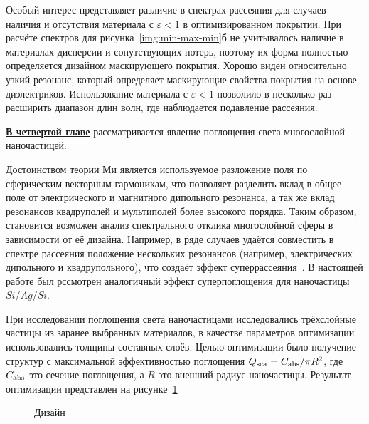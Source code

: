 Особый интерес представляет различие в спектрах рассеяния для случаев
наличия и отсутствия материала с ${\varepsilon<1}$ в оптимизированном
покрытии.  При расчёте спектров для рисунка~\ref{img:min-max-min}б не
учитывалось наличие в материалах дисперсии и сопутствующих потерь,
поэтому их форма полностью определяется дизайном маскирующего
покрытия. Хорошо виден относительно узкий резонанс, который определяет
маскирующие свойства покрытия на основе диэлектриков. Использование
материала с ${\varepsilon<1}$ позволило в несколько раз расширить
диапазон длин волн, где наблюдается подавление рассеяния. 


\underline{\textbf{В четвертой главе}} рассматривается явление
поглощения света многослойной наночастицей.

Достоинством теории Ми является используемое разложение поля по
сферическим векторным гармоникам, что позволяет разделить вклад в
общее поле от электрического и магнитного дипольного резонанса, а так
же вклад резонансов квадруполей и мультиполей более высокого
порядка. Таким образом, становится возможен анализ спектрального
отклика многослойной сферы в зависимости от её дизайна. Например, в
ряде случаев удаётся совместить в спектре рассеяния положение
нескольких резонансов (например, электрических дипольного и
квадрупольного), что создаёт эффект
суперрассеяния~\cite{Fan-2010,Fan-2011}. В настоящей работе был
рссмотрен аналогичный эффект суперпоглощения для наночастицы
$Si/Ag/Si$. 

При исследовании поглощения света наночастицами исследовались
трёхслойные частицы из заранее выбранных материалов, в качестве параметров
оптимизации использовались толщины составных слоёв.  Целью оптимизации
было получение структур с максимальной эффективностью поглощения $Q_{\rm sca} =
C_{\rm abs}/\pi R^2$, где $C_{\rm abs}$ это сечение поглощения, а $R$
это внешний радиус наночастицы.  Результат оптимизации представлен на
рисунке~\ref{img:q-abs}
\begin{figure}[t]
  \begin{minipage}[ht]{0.495\linewidth}
  \end{minipage}
  \hfill
  \begin{minipage}[ht]{0.495\linewidth}
  \end{minipage}
  \caption{Дизайн}
  \label{img:q-abs}  
\end{figure}

